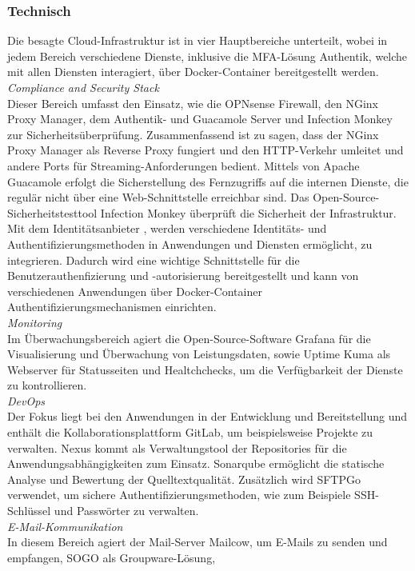 \subsubsection{Technisch}
\label{sec:Technisch}
Die besagte Cloud-Infrastruktur ist in vier Hauptbereiche unterteilt, wobei in jedem Bereich verschiedene Dienste, 
inklusive die MFA-Lösung Authentik, welche mit allen Diensten interagiert, über Docker-Container bereitgestellt werden.
\\\textit{Compliance and Security Stack}
\\Dieser Bereich umfasst den Einsatz, wie die OPNsense Firewall, den NGinx Proxy Manager, dem Authentik- und Guacamole Server 
und Infection Monkey zur Sicherheitsüberprüfung. Zusammenfassend ist zu sagen, dass der NGinx Proxy Manager als Reverse Proxy 
fungiert und den HTTP-Verkehr umleitet und andere Ports für Streaming-Anforderungen bedient. Mittels von Apache Guacamole 
erfolgt die Sicherstellung des Fernzugriffs auf die internen Dienste, die regulär nicht über eine Web-Schnittstelle erreichbar sind.
Das Open-Source-Sicherheitstesttool Infection Monkey überprüft die Sicherheit der Infrastruktur. 
Mit dem Identitätsanbieter \cite{Authentik}, werden verschiedene Identitäts- und Authentifizierungsmethoden in 
Anwendungen und Diensten ermöglicht, zu integrieren. Dadurch wird eine wichtige Schnittstelle für die 
Benutzerauthenfizierung und -autorisierung bereitgestellt und kann von verschiedenen Anwendungen über 
Docker-Container Authentifizierungsmechanismen einrichten.
\\\textit{Monitoring}
\\Im Überwachungsbereich agiert die Open-Source-Software Grafana für die Visualisierung und Überwachung von Leistungsdaten, sowie 
Uptime Kuma als Webserver für Statusseiten und Healtchchecks, um die Verfügbarkeit der Dienste zu kontrollieren. 
\\\textit{DevOps}
\\Der Fokus liegt bei den Anwendungen in der Entwicklung und Bereitstellung und enthält die 
Kollaborationsplattform GitLab, um beispielsweise Projekte zu verwalten. 
Nexus kommt als Verwaltungstool der Repositories für die Anwendungsabhängigkeiten zum Einsatz. Sonarqube ermöglicht die 
statische Analyse und Bewertung der Quelltextqualität. Zusätzlich wird SFTPGo verwendet, um sichere Authentifizierungsmethoden, 
wie zum Beispiele SSH-Schlüssel und Passwörter zu verwalten.
\\\textit{E-Mail-Kommunikation}
\\In diesem Bereich agiert der Mail-Server Mailcow, um E-Mails zu senden und empfangen, SOGO als Groupware-Lösung, 
